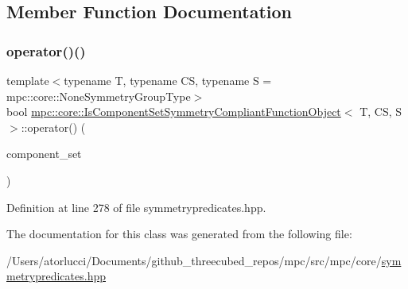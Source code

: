 \subsection{Member Function Documentation}
\mbox{\label{structmpc_1_1core_1_1_is_component_set_symmetry_compliant_function_object_aecd6c223463d118f66d8d3a8f094fd9b}} 
\subsubsection{\texorpdfstring{operator()()}{operator()()}}
{\footnotesize\ttfamily template$<$typename T, typename CS, typename S = mpc\+::core\+::\+None\+Symmetry\+Group\+Type$>$ \\
bool \mbox{\hyperlink{structmpc_1_1core_1_1_is_component_set_symmetry_compliant_function_object}{mpc\+::core\+::\+Is\+Component\+Set\+Symmetry\+Compliant\+Function\+Object}}$<$ T, CS, S $>$\+::operator() (\begin{DoxyParamCaption}\item[{const std\+::set$<$ \mbox{\hyperlink{namespacempc_1_1core_ac3a232afc7c680d580628e834030482f}{mpc\+::core\+::\+Tensor\+Rank4\+Component}}$<$ T $>$ $>$ \&}]{component\+\_\+set }\end{DoxyParamCaption})\hspace{0.3cm}{\ttfamily [inline]}}



Definition at line 278 of file symmetrypredicates.\+hpp.



The documentation for this class was generated from the following file\+:\begin{DoxyCompactItemize}
\item 
/\+Users/atorlucci/\+Documents/github\+\_\+threecubed\+\_\+repos/mpc/src/mpc/core/\mbox{\hyperlink{symmetrypredicates_8hpp}{symmetrypredicates.\+hpp}}\end{DoxyCompactItemize}
